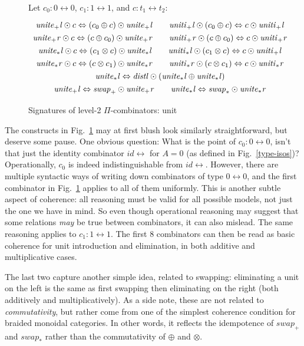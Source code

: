 \documentclass{article}
\newcommand{\identlp}{\mathit{unite}_+\mathit{l}}
\newcommand{\identrp}{\mathit{uniti}_+\mathit{l}}
\newcommand{\identlsp}{\mathit{unite}_+\mathit{r}}
\newcommand{\identrsp}{\mathit{uniti}_+\mathit{r}}
\newcommand{\swapp}{\mathit{swap}_+}
\newcommand{\identlt}{\mathit{unite}_*\mathit{l}}
\newcommand{\identrt}{\mathit{uniti}_*\mathit{l}}
\newcommand{\identlst}{\mathit{unite}_*\mathit{r}}
\newcommand{\identrst}{\mathit{uniti}_*\mathit{r}}
\newcommand{\swapt}{\mathit{swap}_*}
\newcommand{\distl}{\mathit{distl}}
\newcommand{\idc}{\mathit{id}\!\!\leftrightarrow}
\begin{document}
\begin{figure}[tb]
Let $c_0 : 0 \leftrightarrow 0$, $c_1 : 1 \leftrightarrow 1$, and $c : t_1 \leftrightarrow t_2$:
\[\def\arraystretch{1.3}
\begin{array}{c}
  {\identlp \odot c \Leftrightarrow (c_0 \oplus c) \odot \identlp}
\qquad
  {\identrp \odot (c_0 \oplus c) \Leftrightarrow c \odot \identrp}
\\
  {\identlsp \odot c \Leftrightarrow (c \oplus c_0) \odot \identlsp}
\qquad
  {\identrsp \odot (c \oplus c_0) \Leftrightarrow c \odot \identrsp}
\\
  {\identlt \odot c \Leftrightarrow (c_1 \otimes c) \odot \identlt}
\qquad
  {\identrt \odot (c_1 \otimes c) \Leftrightarrow c \odot \identrp}
\\
  {\identlst \odot c \Leftrightarrow (c \otimes c_1) \odot \identlst}
\qquad
  {\identrst \odot (c \otimes c_1) \Leftrightarrow c \odot \identrst}
\\
  {\identlt \Leftrightarrow \distl \odot (\identlt \oplus \identlt)}
\\
\identlp \Leftrightarrow \swapp \odot \identlsp
\qquad
\identlt \Leftrightarrow \swapt \odot \identlst
\end{array}\]
\caption{\label{figg}Signatures of level-2 $\Pi$-combinators: unit}
\end{figure}

The constructs in Fig.~\ref{figg} may at first blush look similarly straightforward,
but deserve some pause. One obvious question: What is the point of
$c_0 : 0 \leftrightarrow 0$, isn't that just the identity combinator $\idc$
for $A = 0$ (as defined in Fig.~\ref{type-isos})? Operationally, $c_0$
is indeed indistinguishable from $\idc$. However, there are multiple syntactic
ways of writing down combinators of type $0 \leftrightarrow 0$, and the
first combinator in Fig.~\ref{figg} applies to all of them uniformly.
This is another subtle aspect of coherence: all reasoning must be valid for
all possible models, not just the one we have in mind. So even though
operational reasoning may suggest that some relations \emph{may} be
true between combinators, it can also mislead. The same reasoning
applies to $c_1 : 1 \leftrightarrow 1$.  The first $8$ combinators can
then be read as basic coherence for unit introduction and elimination,
in both additive and multiplicative cases.

The last two capture
another simple idea, related to swapping: eliminating a unit
on the left is the same as first swapping then eliminating on the
right (both additively and multiplicatively). As a side note,
these are not related to \emph{commutativity}, but rather
come from one of the simplest coherence condition for
braided monoidal categories. In other words, it reflects the
idempotence of $\swapp$ and $\swapt$ rather than the
commutativity of $\oplus$ and $\otimes$.
\end{document}
